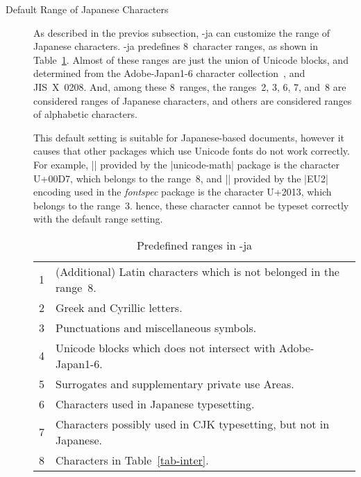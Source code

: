 \documentclass{ajt}
\begin{document}
\begin{description}
\item[Default Range of Japanese Characters] 
As described in the previos subsection, \LuaTeX-ja can customize the
range of Japanese characters.  \LuaTeX-ja predefines 8~character ranges,
as shown in Table~\ref{tab-chrrng}.  Almost of these ranges are just the
union of Unicode blocks, and determined from the Adobe-Japan1-6 character
collection~\cite{aj16}, and JIS~X~0208.  And, among these 8~ranges, the
	   ranges~2, 3, 6, 7, and~8 are considered ranges of Japanese
	   characters, and others are considered ranges of alphabetic
	   characters.

This default setting is suitable for Japanese-based documents, however it
	   causes that other packages which use Unicode fonts do not work
	   correctly. For example, |\times| provided by the
	   |unicode-math| package is the character U+00D7, which belongs
	   to the range~8, and |\textendash| provided by the |EU2|
	   encoding used in the \emph{fontspec} package is the
	   character U+2013, which belongs to the range~3. hence, these
	   character cannot be typeset correctly with the default range setting.

\begin{table}
\caption{Predefined ranges in \LuaTeX-ja}
\label{tab-chrrng}
\begin{center}
\begin{tabular}{@{\bf}rl}
1&(Additional) Latin characters which is not belonged in the range~8.\\
2&Greek and Cyrillic letters.\\
3&Punctuations and miscellaneous symbols.\\
4&Unicode blocks which does not intersect with Adobe-Japan1-6.\\
5&Surrogates and supplementary private use Areas.\\
6&Characters used in Japanese typesetting.\\
7&Characters possibly used in CJK typesetting, but not in Japanese.\\
8&Characters in Table~\ref{tab-inter}.
\end{tabular}
\end{center}
\end{table}



\end{description}
\end{document}
